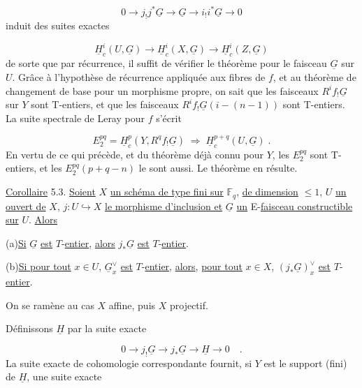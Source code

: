 \begin{equation*}
0 \longrightarrow j_! j^* \underline{G} \longrightarrow \underline{G} \longrightarrow i_! i^* \underline{G} \longrightarrow 0
\end{equation*}
induit des suites exactes

\begin{equation*}
\underline{H}^i_c(U,\underline{G}) \longrightarrow \underline{H}^i_c(X,\underline{G}) \longrightarrow \underline{H}^i_c(Z,\underline{G})
\end{equation*}
de sorte que par récurrence, il suffit de vérifier le théorème pour le faisceau $\underline{G}$ sur $U$. Grâce à l'hypothèse de récurrence appliquée aux fibres de $f$, et au théorème de changement de base pour un morphisme propre, on sait que les faisceaux $R^i f_! \underline{G}$ sur $Y$ sont T-entiers, et que les faisceaux $R^i f_! \underline{G}(i-(n-1))$ sont T-entiers. La suite spectrale de Leray pour $f$ s'écrit

\begin{equation*}
E_2^{pq} = \underline{H}^p_c(Y,R^q f_! \underline{G}) \;\Longrightarrow\; \underline{H}^{p+q}_c(U,\underline{G}) \;.
\end{equation*}
En vertu de ce qui précède, et du théorème déjà connu pour $Y$, les $E_2^{pq}$ sont T-entiers, et les $E_2^{pq}(p+q-n)$ le sont aussi. Le théorème en résulte.

\underline{Corollaire} 5.3. \underline{Soient} $X$ \underline{un schéma de type fini sur} $\mathbb{F}_q$, \underline{de dimension} $\leq 1$, $U$ \underline{un ouvert de} $X$, $j : U \hookrightarrow X$ \underline{le morphisme d'inclusion et} $\underline{G}$ \underline{un} E-\underline{faisceau constructible sur} $U$. \underline{Alors} 



(a)\quad \underline{Si} $\underline{G}$ \underline{est} $T$-\underline{entier}, \underline{alors} $j_*\underline{G}$ \underline{est} $T$-\underline{entier}.

(b)\quad \underline{Si pour tout} $x \in U$, $\underline{G}^\vee_x$ \underline{est} $T$-\underline{entier}, \underline{alors}, \underline{pour tout} $x \in X$, $(j_*\underline{G})_x^\vee$ \underline{est} $T$-\underline{entier}.

On se ramène au cas $X$ affine, puis $X$ projectif.

Définissons $\underline{H}$ par la suite exacte

\begin{equation*}
0 \longrightarrow j_!\underline{G} \longrightarrow j_*\underline{G} \longrightarrow \underline{H} \longrightarrow 0 \quad .
\end{equation*}
La suite exacte de cohomologie correspondante fournit, si $Y$ est le support (fini) de $\underline{H}$, une suite exacte

